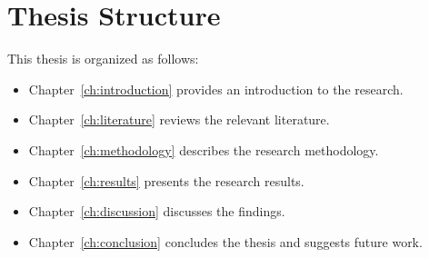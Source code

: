 \section{Thesis Structure}
This thesis is organized as follows:
\begin{itemize}
    \item Chapter~\ref{ch:introduction} provides an introduction to the research.
    \item Chapter~\ref{ch:literature} reviews the relevant literature.
    \item Chapter~\ref{ch:methodology} describes the research methodology.
    \item Chapter~\ref{ch:results} presents the research results.
    \item Chapter~\ref{ch:discussion} discusses the findings.
    \item Chapter~\ref{ch:conclusion} concludes the thesis and suggests future work.
\end{itemize}

